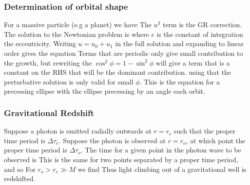 \documentclass{article}
\begin{document}
\subsubsection{Determination of orbital shape}
For a massive particle (e.g a planet) we have 
The $u^3$ term is the GR correction. The solution to the Newtonian problem is 
where $e$ is the constant of integration the eccentricity. Writing $u = u_0 + u_1$ in the full solution and expanding to linear order gives the equation 
Terms that are periodic only give small contribution to the growth, but rewriting the $\cos^2\phi = 1 - \sin^2\phi$ will give a term that is a constant on the RHS that will be the dominant contribution. 
using that the perturbative solution is only valid for small $\phi$. This is the equation for a precessing ellipse with the ellipse precessing by an angle 
each orbit.
\subsubsection{Gravitational Redshift}
Suppose a photon is emitted radially outwards at $r=r_e$ such that the proper time period is $\Delta \tau_e$. Suppose the photon is observed at $r=r_o$, at which point the proper time period is $\Delta \tau_o$. The time for a given point in the photon wave to be observed is 
This is the same for two points separated by a proper time period, and so 
For $r_o > r_e \gg M$ we find 
Thus light climbing out of a gravitational well is redshifted. 
\end{document}
